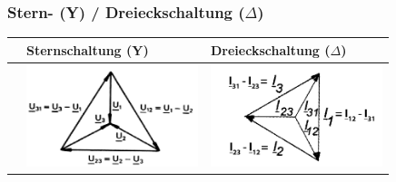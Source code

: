 		\subsubsection{Stern- (Y) / Dreieckschaltung ($\Delta$)}
            	\renewcommand{\arraystretch}{1.5}
			\begin{tabular}{| p{4.5cm} | l | l |}
				\hline
	 				& Sternschaltung (Y)		& Dreieckschaltung ($\Delta$)\\
	 			\hline
	 			\vspace{0.2cm}
	 				&
	 					\includegraphics[width=5cm]{bilder/Sternspannung.png} &
	 					\includegraphics[width=5cm]{bilder/Dreieckstrom.png} \\
						

\end{tabular}
